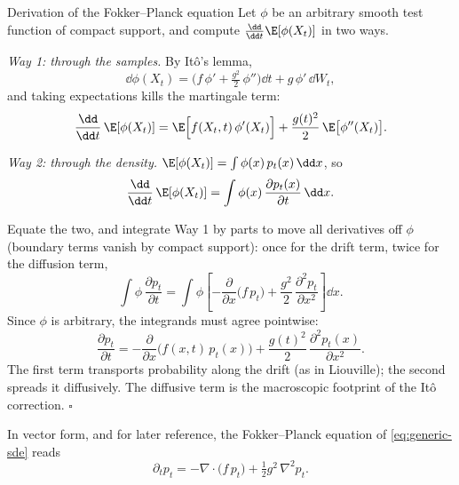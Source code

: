 \begin{toolbox}{Derivation of the Fokker--Planck equation}
Let $\phi$ be an arbitrary smooth test function of compact support, and
compute $\frac{\dd}{\dd t}\E[\phi(X_t)]$ in two ways.

\emph{Way 1: through the samples.} By It\^o's lemma,
\begin{equation*}
  \dd \phi(X_t)
  = \Big( f\,\phi' + \tfrac{g^2}{2}\,\phi'' \Big)\dd t
  + g\,\phi'\,\dd W_t ,
\end{equation*}
and taking expectations kills the martingale term:
\begin{equation*}
  \frac{\dd}{\dd t}\,\E[\phi(X_t)]
  = \E\Big[ f(X_t,t)\,\phi'(X_t) \Big]
  + \frac{g(t)^2}{2}\, \E\big[ \phi''(X_t) \big] .
\end{equation*}

\emph{Way 2: through the density.}
$\E[\phi(X_t)] = \int \phi(x)\, p_t(x)\,\dd x$, so
\begin{equation*}
  \frac{\dd}{\dd t}\,\E[\phi(X_t)]
  = \int \phi(x)\, \frac{\partial p_t(x)}{\partial t}\, \dd x .
\end{equation*}

Equate the two, and integrate Way 1 by parts to move all derivatives off
$\phi$ (boundary terms vanish by compact support): once for the drift
term, twice for the diffusion term,
\begin{equation*}
  \int \phi\, \frac{\partial p_t}{\partial t}
  = \int \phi \left[
      -\frac{\partial}{\partial x}\big( f\, p_t \big)
      + \frac{g^2}{2}\, \frac{\partial^2 p_t}{\partial x^2}
    \right] \dd x .
\end{equation*}
Since $\phi$ is arbitrary, the integrands must agree pointwise:
\begin{equation*}
  \boxed{\;
  \frac{\partial p_t}{\partial t}
  = -\frac{\partial}{\partial x}\big( f(x,t)\, p_t(x) \big)
  + \frac{g(t)^2}{2}\, \frac{\partial^2 p_t(x)}{\partial x^2} .
  \;}
\end{equation*}
The first term transports probability along the drift (as in Liouville);
the second spreads it diffusively. The diffusive term is the macroscopic
footprint of the It\^o correction. \hfill$\square$
\end{toolbox}

In vector form, and for later reference, the Fokker--Planck equation of
\eqref{eq:generic-sde} reads
\begin{equation}
  \partial_t p_t = -\nabla \cdot \big( f\, p_t \big)
  + \tfrac{1}{2} g^2\, \nabla^2 p_t .
  \label{eq:fokker-planck}
\end{equation}

